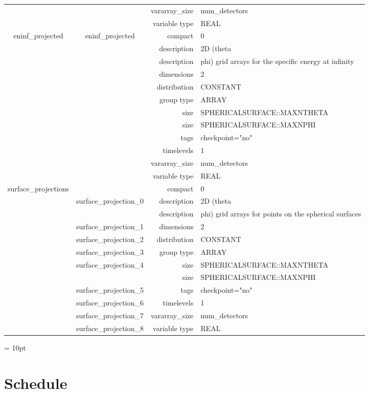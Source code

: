 \begin{tabular*}{150mm}{|c|c@{\extracolsep{\fill}}|rl|}
 &  & vararray\_size & num\_detectors \\ 
 &  & variable type & REAL \\ 
\hline 
eninf\_projected & eninf\_projected & compact & 0 \\ 
 &  & description & 2D (theta \\ 
& ~ & description & phi) grid arrays for the specific energy at infinity \\ 
 &  & dimensions & 2 \\ 
 &  & distribution & CONSTANT \\ 
 &  & group type & ARRAY \\ 
 &  & size & SPHERICALSURFACE::MAXNTHETA \\ 
& ~ & size & SPHERICALSURFACE::MAXNPHI \\ 
 &  & tags & checkpoint="no" \\ 
 &  & timelevels & 1 \\ 
 &  & vararray\_size & num\_detectors \\ 
 &  & variable type & REAL \\ 
\hline 
surface\_projections &  & compact & 0 \\ 
 & surface\_projection\_0 & description & 2D (theta \\ 
& ~ & description & phi) grid arrays for points on the spherical surfaces \\ 
 & surface\_projection\_1 & dimensions & 2 \\ 
 & surface\_projection\_2 & distribution & CONSTANT \\ 
 & surface\_projection\_3 & group type & ARRAY \\ 
 & surface\_projection\_4 & size & SPHERICALSURFACE::MAXNTHETA \\ 
& ~ & size & SPHERICALSURFACE::MAXNPHI \\ 
 & surface\_projection\_5 & tags & checkpoint="no" \\ 
 & surface\_projection\_6 & timelevels & 1 \\ 
 & surface\_projection\_7 & vararray\_size & num\_detectors \\ 
 & surface\_projection\_8 & variable type & REAL \\ 
\hline 
\end{tabular*} 



\vspace{5mm}\parskip = 10pt 

\section{Schedule} 


